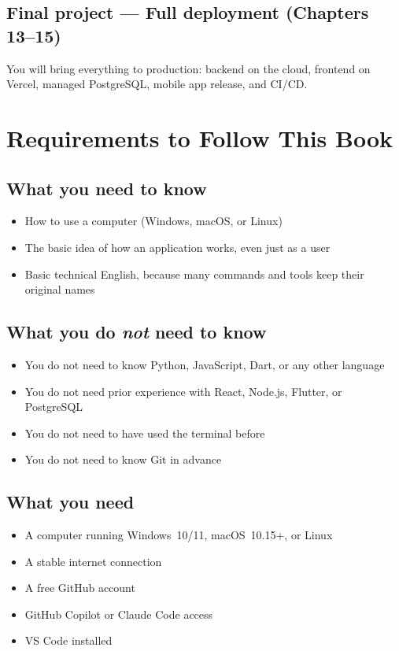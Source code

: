 \subsection*{Final project --- Full deployment (Chapters 13--15)}
You will bring everything to production: backend on the cloud, frontend on Vercel, managed PostgreSQL, mobile app release, and CI/CD.

\section{Requirements to Follow This Book}

\subsection*{What you need to know}
\begin{itemize}
  \item How to use a computer (Windows, macOS, or Linux)
  \item The basic idea of how an application works, even just as a user
  \item Basic technical English, because many commands and tools keep their original names
\end{itemize}

\subsection*{What you do \emph{not} need to know}
\begin{itemize}
  \item You do not need to know Python, JavaScript, Dart, or any other language
  \item You do not need prior experience with React, Node.js, Flutter, or PostgreSQL
  \item You do not need to have used the terminal before
  \item You do not need to know Git in advance
\end{itemize}

\subsection*{What you need}
\begin{itemize}
  \item A computer running Windows~10/11, macOS~10.15+, or Linux
  \item A stable internet connection
  \item A free GitHub account
  \item GitHub Copilot or Claude Code access
  \item VS Code installed
\end{itemize}

